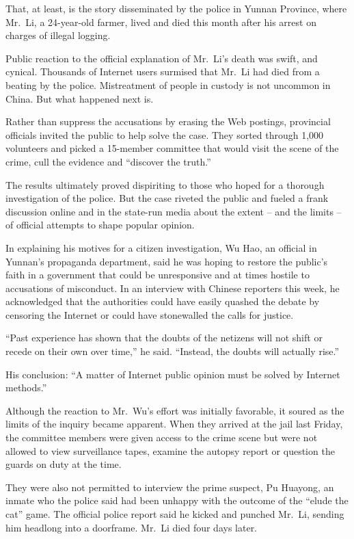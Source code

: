 \documentclass[12pt,a4paper,onecolumn]{article}
\begin{document}
\begin{CJK*}{GBK}{song}
That, at least, is the story disseminated by the police in Yunnan Province, where Mr.~Li, a
24-year-old farmer, lived and died this month after his arrest on charges of illegal logging.

Public reaction to the official explanation of Mr.~Li's death was swift, and cynical. Thousands of
Internet users surmised that Mr.~Li had died from a beating by the police. Mistreatment of people in
custody is not uncommon in China. But what happened next is.

Rather than suppress the accusations by erasing the Web postings, provincial officials invited the
public to help solve the case. They sorted through 1,000 volunteers and picked a 15-member committee
that would visit the scene of the crime, cull the evidence and ``discover the truth.''

The results ultimately proved dispiriting to those who hoped for a thorough investigation of the
police. But the case riveted the public and fueled a frank discussion online and in the state-run
media about the extent -- and the limits -- of official attempts to shape popular opinion.

In explaining his motives for a citizen investigation, Wu Hao, an official in Yunnan's propaganda
department, said he was hoping to restore the public's faith in a government that could be
unresponsive and at times hostile to accusations of misconduct. In an interview with Chinese
reporters this week, he acknowledged that the authorities could have easily quashed the debate by
censoring the Internet or could have stonewalled the calls for justice.

``Past experience has shown that the doubts of the netizens will not shift or recede on their own
over time,'' he said. ``Instead, the doubts will actually rise.''

His conclusion: ``A matter of Internet public opinion must be solved by Internet methods.''

Although the reaction to Mr.~Wu's effort was initially favorable, it soured as the limits of the
inquiry became apparent. When they arrived at the jail last Friday, the committee members were given
access to the crime scene but were not allowed to view surveillance tapes, examine the autopsy
report or question the guards on duty at the time.

They were also not permitted to interview the prime suspect, Pu Huayong, an inmate who the police
said had been unhappy with the outcome of the ``elude the cat'' game. The official police report
said he kicked and punched Mr.~Li, sending him headlong into a doorframe. Mr.~Li died four days
later.


\end{CJK*}
\end{document}
